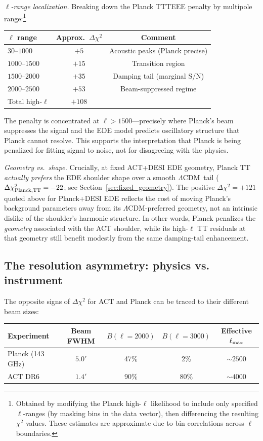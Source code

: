 \documentclass[twocolumn,showpacs,preprintnumbers,amsmath,amssymb,prd]{revtex4-2}
\newcommand{\lcdm}{$\Lambda$CDM}
\begin{document}
\emph{$\ell$-range localization.} Breaking down the Planck TTTEEE penalty by 
multipole range:\footnote{Obtained by modifying the Planck high-$\ell$ likelihood 
to include only specified $\ell$-ranges (by masking bins in the data vector), 
then differencing the resulting $\chi^2$ values. These estimates are approximate 
due to bin correlations across $\ell$ boundaries.}
\begin{center}
\begin{tabular}{lcc}
\toprule
$\ell$ range & Approx.\ $\Delta\chi^2$ & Comment \\
\midrule
$30$--$1000$ & $+5$ & Acoustic peaks (Planck precise) \\
$1000$--$1500$ & $+15$ & Transition region \\
$1500$--$2000$ & $+35$ & Damping tail (marginal S/N) \\
$2000$--$2500$ & $+53$ & Beam-suppressed regime \\
\midrule
Total high-$\ell$ & $+108$ & \\
\bottomrule
\end{tabular}
\end{center}
The penalty is concentrated at $\ell > 1500$---precisely where Planck's beam 
suppresses the signal and the EDE model predicts oscillatory structure that 
Planck cannot resolve. This supports the interpretation that Planck is being 
penalized for fitting signal to noise, not for disagreeing with the physics.

\emph{Geometry vs.\ shape.} Crucially, at fixed ACT+DESI EDE geometry, 
Planck TT \emph{actually prefers} the EDE shoulder shape over a smooth 
\lcdm\ tail ($\Delta\chi^2_{\rm Planck,TT} = -22$; see Section~\ref{sec:fixed_geometry}). 
The positive $\Delta\chi^2 = +121$ quoted above for Planck+DESI EDE reflects 
the cost of moving Planck's background parameters away from its \lcdm-preferred 
geometry, not an intrinsic dislike of the shoulder's harmonic structure. 
In other words, Planck penalizes the \emph{geometry} associated with the 
ACT shoulder, while its high-$\ell$ TT residuals at that geometry still 
benefit modestly from the same damping-tail enhancement.

\subsection{The resolution asymmetry: physics vs. instrument}

The opposite signs of $\Delta\chi^2$ for ACT and Planck can be traced to their 
different beam sizes:
\begin{center}
\begin{tabular}{lcccc}
\toprule
Experiment & Beam FWHM & $B(\ell=2000)$ & $B(\ell=3000)$ & Effective $\ell_{\rm max}$ \\
\midrule
Planck (143 GHz) & $5.0'$ & 47\% & 2\% & $\sim 2500$ \\
ACT DR6 & $1.4'$ & 90\% & 80\% & $\sim 4000$ \\
\bottomrule
\end{tabular}
\end{center}
\end{document}
